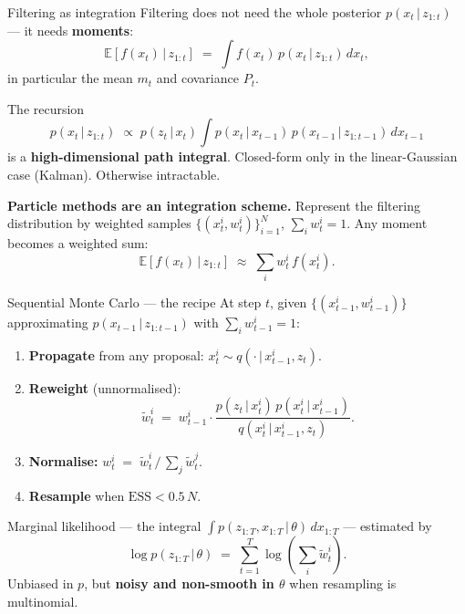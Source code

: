 \documentclass[10pt,aspectratio=169]{beamer}
\newcommand{\E}{\mathbb{E}}
\newcommand{\given}{\,|\,}
\begin{document}
\begin{frame}{Filtering as integration}
  Filtering does not need the whole posterior $p(x_t \given z_{1:t})$ --- it needs \textbf{moments}:
  \[
    \E[f(x_t) \given z_{1:t}] \;=\; \int f(x_t)\, p(x_t \given z_{1:t})\, dx_t,
  \]
  in particular the mean $m_t$ and covariance $P_t$.

  \medskip
  The recursion
  \[
    p(x_t \given z_{1:t}) \;\propto\; p(z_t \given x_t) \int p(x_t \given x_{t-1})\, p(x_{t-1} \given z_{1:t-1})\, dx_{t-1}
  \]
  is a \textbf{high-dimensional path integral}. Closed-form only in the linear-Gaussian case (Kalman). Otherwise intractable.

  \medskip
  \textbf{Particle methods are an integration scheme.} Represent the filtering distribution by weighted samples $\{(x_t^i, w_t^i)\}_{i=1}^N$, $\sum_i w_t^i = 1$. Any moment becomes a weighted sum:
  \[
    \E[f(x_t) \given z_{1:t}] \;\approx\; \sum_i w_t^i\, f(x_t^i).
  \]
\end{frame}

\begin{frame}{Sequential Monte Carlo --- the recipe}
  At step $t$, given $\{(x_{t-1}^i, w_{t-1}^i)\}$ approximating $p(x_{t-1} \given z_{1:t-1})$ with $\sum_i w_{t-1}^i = 1$:
  \begin{enumerate}\setlength{\itemsep}{0.3em}
    \item \textbf{Propagate} from any proposal: $x_t^i \sim q(\cdot \given x_{t-1}^i, z_t)$.
    \item \textbf{Reweight} (unnormalised):
    \[
      \tilde w_t^i \;=\; w_{t-1}^i \cdot \dfrac{p(z_t\given x_t^i)\, p(x_t^i\given x_{t-1}^i)}{q(x_t^i \given x_{t-1}^i, z_t)}.
    \]
    \item \textbf{Normalise:} $w_t^i \;=\; \tilde w_t^i \,/\, \sum_j \tilde w_t^j$.
    \item \textbf{Resample} when $\mathrm{ESS} < 0.5\, N$.
  \end{enumerate}

  \medskip
  Marginal likelihood --- the integral $\int p(z_{1:T}, x_{1:T}\given\theta)\, dx_{1:T}$ --- estimated by
  \[
    \log p(z_{1:T}\given\theta) \;=\; \sum_{t=1}^T \log\!\left(\sum_i \tilde w_t^i\right).
  \]
  Unbiased in $p$, but \textbf{noisy and non-smooth in $\theta$} when resampling is multinomial.
\end{frame}
\end{document}
